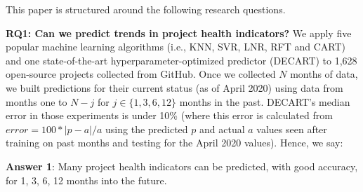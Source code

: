 \documentclass[sigconf,review,anonymous]{acmart}
\begin{document}
 
 

 

  
\noindent
This paper is structured around the following  research questions.
  

 
 

 



\textbf{RQ1: Can we predict   trends in project health indicators?}
We apply five popular machine learning algorithms (i.e., KNN, SVR, LNR, RFT and CART) and one state-of-the-art hyperparameter-optimized predictor (DECART) to   1,628 open-source projects collected from GitHub. 
Once we collected $N$ months of data, we built predictions for  their current status
(as of April 2020)
using data from months one to  $\mathit{N-j}$  for $\mathit{j\in\{1,3,6,12\}}$  months in the past.
 DECART's median error in those experiments is under 10\%
 (where  this error is  calculated from  $\mathit{error}=100*|p-a|/a$  using the predicted $p$ and actual $a$  values  seen after   training on past months and testing for the April 2020 values). Hence, we say:




\begin{blockquote}
\noindent
\textbf{Answer 1}: Many project health indicators can be predicted, with good accuracy, for 1, 3, 6, 12   months into the future.
\end{blockquote} 
\end{document}
